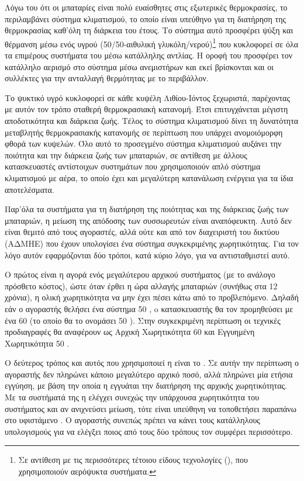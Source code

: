 \documentclass[12pt]{report}
\begin{document}
Λόγω του ότι οι μπαταρίες είναι πολύ ευαίσθητες στις εξωτερικές θερμοκρασίες, το {} περιλαμβάνει σύστημα κλιματισμού, το οποίο είναι υπεύθηνο για τη διατήρηση της θερμοκρασίας καθ'όλη τη διάρκεια του έτους. 
Το σύστημα αυτό προσφέρει ψύξη και θέρμανση μέσω ενός υγρού (50/50-αιθυλική γλυκόλη/νερού)\footnote{Σε αντίθεση με τις περισσότερες τέτοιου είδους τεχνολογίες ({}), που χρησιμοποιούν 
αερόψυκτα συστήματα.} που κυκλοφορεί σε όλα τα επιμέρους συστήματα του {} μέσω κατάλληλης αντλίας. Η οροφή του {} προσφέρει τον κατάλληλο αερισμό στο σύστημα μέσω ανεμιστήρων και εκεί 
βρίσκονται και οι συλλέκτες για την ανταλλαγή θερμότητας με το περιβάλλον.

Το ψυκτικό υγρό κυκλοφορεί σε κάθε κυψέλη Λιθίου-Ιόντος ξεχωριστά, παρέχοντας με αυτόν τον τρόπο σταθερή θερμοκρασιακή κατανομή. Έτσι επιτυγχάνεται μέγιστη αποδοτικότητα και διάρκεια ζωής. Τέλος το σύστημα κλιματισμού 
δίνει τη δυνατότητα μεταβλητής θερμοκρασιακής κατανομής σε περίπτωση που υπάρχει ανομοιόμορφη φθορά των κυψελών. Όλο αυτό το προσεγμένο σύστημα κλιματισμού αυξάνει την ποιότητα και την
διάρκεια ζωής των μπαταριών, σε αντίθεση με άλλους κατασκευαστές αντίστοιχων συστημάτων που χρησιμοποιούν απλό σύστημα κλιματισμού με αέρα, το οποίο έχει και μεγαλύτερη κατανάλωση ενέργεια για τα ίδια αποτελέσματα.

Παρ'όλα τα συστήματα για τη διατήρηση της ποιότητας και της διάρκειας ζωής των μπαταριών, η μείωση της απόδοσης των συσσωρευτών είναι αναπόφευκτη. Αυτό δεν είναι θεμιτό από τους αγοραστές, αλλά ούτε και από τον διαχειριστή του 
δικτύου (ΑΔΜΗΕ) που έχουν υπολογίσει ένα σύστημα συγκεκριμένης χωρητικότητας. Για τον λόγο αυτόν εφαρμόζονται δύο τρόποι, κατά κύριο λόγο, για να αντισταθμιστεί αυτό. 

Ο πρώτος είναι η αγορά ενός μεγαλύτερου αρχικού συστήματος (με το ανάλογο πρόσθετο κόστος), ώστε όταν έρθει η ώρα αλλαγής μπαταριών (συνήθως στα 12 χρόνια), η ολική χωρητικότητα να μην έχει πέσει κάτω από το προβλεπόμενο. 
Δηλαδή εάν ο αγοραστής θελήσει ένα σύστημα 50 {}, o κατασκευαστής θα τον προμηθεύσει με ένα 60 {} (το οποίο θα το ονομάσει 50 {}). Στην συγκεκριμένη περίπτωση οι τεχνικές προδιαγραφές 
θα αναφέρουν ως Αρχική Χωρητικότητα 60 {} και Εγγυημένη Χωρητικότητα 50 {}.

Ο δεύτερος τρόπος και αυτός που χρησιμοποιεί η {} είναι το {}. Σε αυτήν την περίπτωση ο αγοραστής δεν πληρώνει κάποιο μεγαλύτερο αρχικό ποσό, αλλά
πληρώνει μία ετήσια εγγύηση, με βάση την οποία η {} εγγυάται την διατήρηση της αρχικής χωρητικότητας. Με τα συστήματά της η {} ελέγχει συνεχώς την υπάρχουσα χωρητικότητα του συστήματος
και αν ανιχνεύσει μείωση, τότε είναι υπεύθηνη να τοποθετήσει παραπάνω {} στο υφιστάμενο {}. Ο αγοραστής συνεπώς πρέπει να κάνει τους κατάλληλους υπολογισμούς για να ελέγξει 
ποιος από τους δύο τρόπους τον συμφέρει περισσότερο.
\end{document}
